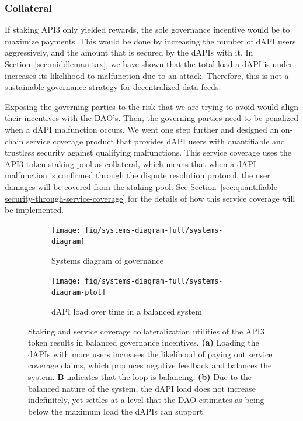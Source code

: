 \documentclass[11pt]{article}
\begin{document}
\subsubsection{Collateral}
\label{sec:collateral}

If staking API3 only yielded rewards, the sole governance incentive would be to maximize payments.
This would be done by increasing the number of dAPI users aggressively, and the amount that is secured by the dAPIs with it.
In Section~\ref{sec:middleman-tax}, we have shown that the total load a dAPI is under increases its likelihood to malfunction due to an attack.
Therefore, this is not a sustainable governance strategy for decentralized data feeds.

Exposing the governing parties to the risk that we are trying to avoid would align their incentives with the DAO’s.
Then, the governing parties need to be penalized when a dAPI malfunction occurs.
We went one step further and designed an on-chain service coverage product that provides dAPI users with quantifiable and trustless security against qualifying malfunctions.
This service coverage uses the API3 token staking pool as collateral, which means that when a dAPI malfunction is confirmed through the dispute resolution protocol, the user damages will be covered from the staking pool.
See Section~\ref{sec:quantifiable-security-through-service-coverage} for the details of how this service coverage will be implemented.

\begin{figure}
     \centering
     \begin{subfigure}{0.49\textwidth}
         \texttt{[image: fig/systems-diagram-full/systems-diagram]}
         \caption{Systems diagram of governance}
         \label{fig:systems-diagram}
     \end{subfigure}
     \begin{subfigure}{0.49\textwidth}
         \texttt{[image: fig/systems-diagram-full/systems-diagram-plot]}
         \caption{dAPI load over time in a balanced system}
         \label{fig:systems-diagram-plot}
     \end{subfigure}
    \caption{Staking and service coverage collateralization utilities of the API3 token results in balanced governance incentives.
    \textbf{(a)} Loading the dAPIs with more users increases the likelihood of paying out service coverage claims, which produces negative feedback and balances the system. \textbf{B} indicates that the loop is balancing.
   \textbf{(b)} Due to the balanced nature of the system, the dAPI load does not increase indefinitely, yet settles at a level that the DAO estimates as being below the maximum load the dAPIs can support.}
    \label{fig:systems-diagram-full}
\end{figure}
\end{document}
